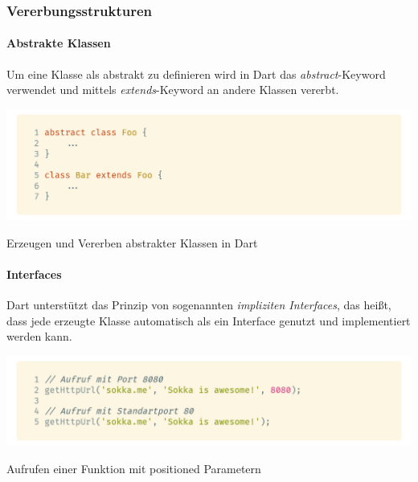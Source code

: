 \subsubsection{Vererbungsstrukturen}

\paragraph{Abstrakte Klassen}


Um eine Klasse als abstrakt zu definieren wird in Dart das \textit{abstract}-Keyword verwendet und mittels
\textit{extends}-Keyword an andere Klassen vererbt.

\begin{code}
    \centering
    \includegraphics[width=1\textwidth]{images/Dart/dartAbstractClass.png}
    \caption{Erzeugen und Vererben abstrakter Klassen in Dart}
\end{code}

\paragraph{Interfaces}
 

Dart unterstützt das Prinzip von sogenannten \textit{impliziten Interfaces}, das heißt, dass jede
erzeugte Klasse automatisch als ein Interface genutzt und implementiert werden kann.

\begin{code}
    \centering
    \includegraphics[width=1\textwidth]{images/Dart/dartCallPositionedFunction.png}
    \caption{Aufrufen einer Funktion mit positioned Parametern}
\end{code}
